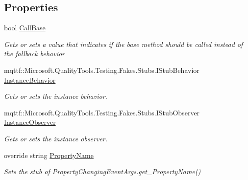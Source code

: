 \subsection*{Properties}
\begin{DoxyCompactItemize}
\item 
bool \hyperlink{class_system_1_1_component_model_1_1_fakes_1_1_stub_property_changing_event_args_ae9eb5cfdc1bab44b85c8d20707f39973}{Call\-Base}
\begin{DoxyCompactList}\small\item\em Gets or sets a value that indicates if the base method should be called instead of the fallback behavior\end{DoxyCompactList}\item 
mqttf\-::\-Microsoft.\-Quality\-Tools.\-Testing.\-Fakes.\-Stubs.\-I\-Stub\-Behavior \hyperlink{class_system_1_1_component_model_1_1_fakes_1_1_stub_property_changing_event_args_a9a17684f7884ec100571be065843a992}{Instance\-Behavior}
\begin{DoxyCompactList}\small\item\em Gets or sets the instance behavior.\end{DoxyCompactList}\item 
mqttf\-::\-Microsoft.\-Quality\-Tools.\-Testing.\-Fakes.\-Stubs.\-I\-Stub\-Observer \hyperlink{class_system_1_1_component_model_1_1_fakes_1_1_stub_property_changing_event_args_adfcee01eebd7c873faa132d81f482a80}{Instance\-Observer}
\begin{DoxyCompactList}\small\item\em Gets or sets the instance observer.\end{DoxyCompactList}\item 
override string \hyperlink{class_system_1_1_component_model_1_1_fakes_1_1_stub_property_changing_event_args_a7b3e9151492b4d1046df8e6295a65d6d}{Property\-Name}
\begin{DoxyCompactList}\small\item\em Sets the stub of Property\-Changing\-Event\-Args.\-get\-\_\-\-Property\-Name()\end{DoxyCompactList}\end{DoxyCompactItemize}


